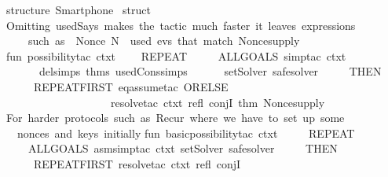 \begin{isabellebody}
  \endisatagproof
  {\isafoldproof}%
  \isadelimproof
  \endisadelimproof
  \isadelimdocument
  \endisadelimdocument
  \isatagdocument
  \isamarkuptrue%
  \endisatagdocument
  {\isafolddocument}%
  \isadelimdocument
  \endisadelimdocument
  \isadelimML
  \endisadelimML
  \isatagML
  \isamarkupfalse%
  \isanewline
  {\isacartoucheopen}\isanewline
  structure\ Smartphone\ {\isacharequal}\isanewline
  struct\isanewline
  \isanewline
  {\isacharparenleft}{\isacharasterisk}Omitting\ used{\isacharunderscore}Says\ makes\ the\ tactic\ much\ faster{\isacharcolon}\ it\ leaves\ expressions\isanewline
  \ \ \ \ such\ as\ \ Nonce\ {\isacharquery}N\ {\isasymnotin}\ used\ evs\ that\ match\ Nonce{\isacharunderscore}supply{\isacharasterisk}{\isacharparenright}\isanewline
  fun\ possibility{\isacharunderscore}tac\ ctxt\ {\isacharequal}\isanewline
  \ \ \ {\isacharparenleft}REPEAT\ \isanewline
  \ \ \ \ {\isacharparenleft}ALLGOALS\ {\isacharparenleft}simp{\isacharunderscore}tac\ {\isacharparenleft}ctxt\isanewline
  \ \ \ \ \ \ delsimps\ {\isacharat}{\isacharbraceleft}thms\ used{\isacharunderscore}Cons{\isacharunderscore}simps{\isacharbraceright}\isanewline
  \ \ \ \ \ \ setSolver\ safe{\isacharunderscore}solver{\isacharparenright}{\isacharparenright}\isanewline
  \ \ \ \ \ THEN\isanewline
  \ \ \ \ \ REPEAT{\isacharunderscore}FIRST\ {\isacharparenleft}eq{\isacharunderscore}assume{\isacharunderscore}tac\ ORELSE{\isacharprime}\ \isanewline
  \ \ \ \ \ \ \ \ \ \ \ \ \ \ \ \ \ \ \ resolve{\isacharunderscore}tac\ ctxt\ {\isacharbrackleft}refl{\isacharcomma}\ conjI{\isacharcomma}\ {\isacharat}{\isacharbraceleft}thm\ Nonce{\isacharunderscore}supply{\isacharbraceright}{\isacharbrackright}{\isacharparenright}{\isacharparenright}{\isacharparenright}\isanewline
  \isanewline
  {\isacharparenleft}{\isacharasterisk}For\ harder\ protocols\ {\isacharparenleft}such\ as\ Recur{\isacharparenright}\ where\ we\ have\ to\ set\ up\ some\isanewline
  \ \ nonces\ and\ keys\ initially{\isacharasterisk}{\isacharparenright}\isanewline
  fun\ basic{\isacharunderscore}possibility{\isacharunderscore}tac\ ctxt\ {\isacharequal}\isanewline
  \ \ \ \ REPEAT\ \isanewline
  \ \ \ \ {\isacharparenleft}ALLGOALS\ {\isacharparenleft}asm{\isacharunderscore}simp{\isacharunderscore}tac\ {\isacharparenleft}ctxt\ setSolver\ safe{\isacharunderscore}solver{\isacharparenright}{\isacharparenright}\isanewline
  \ \ \ \ \ THEN\isanewline
  \ \ \ \ \ REPEAT{\isacharunderscore}FIRST\ {\isacharparenleft}resolve{\isacharunderscore}tac\ ctxt\ {\isacharbrackleft}refl{\isacharcomma}\ conjI{\isacharbrackright}{\isacharparenright}{\isacharparenright}\isanewline

\end{isabellebody}
